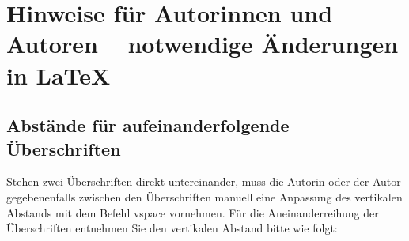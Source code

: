 \chapter[Hinweise für Autorinnen und Autoren]{Hinweise für Autorinnen \newline und Autoren -- notwendige Änderungen in \LaTeX}
\label{chap:Hinweise}





\section{Abstände für aufeinanderfolgende Überschriften}
\label{sec:Abstaende fuer aufeinanderfolgende Ueberschriften}
Stehen zwei Überschriften direkt untereinander, muss die Autorin oder der Autor gegebenenfalls zwischen den Überschriften manuell eine Anpassung des vertikalen Abstands mit dem Befehl \glqq vspace\grqq{} vornehmen. Für die Aneinanderreihung der Überschriften entnehmen Sie den vertikalen Abstand bitte wie folgt:

